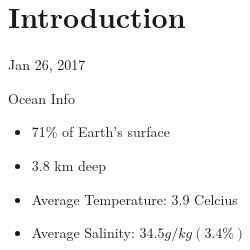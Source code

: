 \documentclass[main.tex]{subfiles}
\begin{document}
\section{Introduction}
\hrulefill

Jan 26, 2017

\vspace{3mm}

Ocean Info

\begin{itemize}
    \item 71\% of Earth's surface
    \item 3.8 km deep
    \item Average Temperature: 3.9 Celcius
    \item Average Salinity: $34.5 g/kg (3.4\%)$
\end{itemize}
\end{document}

